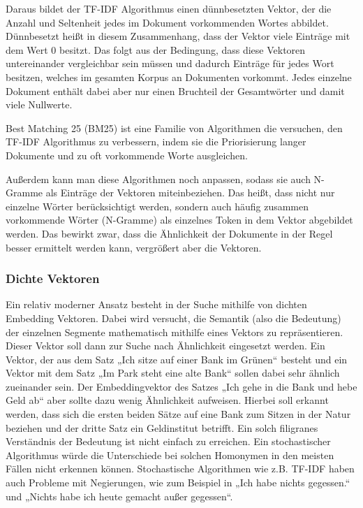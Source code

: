 Daraus bildet der TF-IDF Algorithmus einen dünnbesetzten Vektor, der die Anzahl und Seltenheit jedes im Dokument vorkommenden Wortes abbildet. 
Dünnbesetzt heißt in diesem Zusammenhang, dass der Vektor viele Einträge mit dem Wert 0 besitzt. 
Das folgt aus der Bedingung, dass diese Vektoren untereinander vergleichbar sein müssen und dadurch Einträge für jedes Wort besitzen, welches im gesamten Korpus an Dokumenten vorkommt.
Jedes einzelne Dokument enthält dabei aber nur einen Bruchteil der Gesamtwörter und damit viele Nullwerte.

Best Matching 25 (BM25) ist eine Familie von Algorithmen die versuchen, den TF-IDF Algorithmus zu verbessern, indem sie die Priorisierung langer Dokumente und zu oft vorkommende Worte ausgleichen.

Außerdem kann man diese Algorithmen noch anpassen, sodass sie auch N-Gramme als Einträge der Vektoren miteinbeziehen. 
Das heißt, dass nicht nur einzelne Wörter berücksichtigt werden, sondern auch häufig zusammen vorkommende Wörter (N-Gramme) als einzelnes Token in dem Vektor abgebildet werden. 
Das bewirkt zwar, dass die Ähnlichkeit der Dokumente in der Regel besser ermittelt werden kann, vergrößert aber die Vektoren.

\subsubsection{Dichte Vektoren}

Ein relativ moderner Ansatz besteht in der Suche mithilfe von dichten Embedding Vektoren. 
Dabei wird versucht, die Semantik (also die Bedeutung) der einzelnen Segmente mathematisch mithilfe eines Vektors zu repräsentieren. 
Dieser Vektor soll dann zur Suche nach Ähnlichkeit eingesetzt werden. 
Ein Vektor, der aus dem Satz „Ich sitze auf einer Bank im Grünen“ besteht und ein Vektor mit dem Satz „Im Park steht eine alte Bank“ sollen dabei sehr ähnlich zueinander sein. 
Der Embeddingvektor des Satzes „Ich gehe in die Bank und hebe Geld ab“ aber sollte dazu wenig Ähnlichkeit aufweisen. 
Hierbei soll erkannt werden, dass sich die ersten beiden Sätze auf eine Bank zum Sitzen in der Natur beziehen und der dritte Satz ein Geldinstitut betrifft. 
Ein solch filigranes Verständnis der Bedeutung ist nicht einfach zu erreichen. 
Ein stochastischer Algorithmus würde die Unterschiede bei solchen Homonymen in den meisten Fällen nicht erkennen können. 
Stochastische Algorithmen wie z.B. TF-IDF haben auch Probleme mit Negierungen, wie zum Beispiel in „Ich habe nichts gegessen.“ und „Nichts habe ich heute gemacht außer gegessen“.

